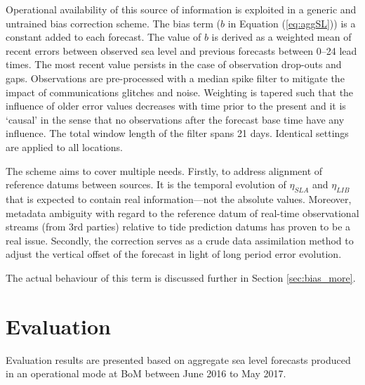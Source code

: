 Operational availability of this source of information is exploited in a generic and untrained bias correction scheme. 
The bias term ($b$ in Equation (\ref{eq:aggSL})) is a constant added to each forecast.
The value of $b$ is derived as a weighted mean of recent errors between observed sea level and previous forecasts between 0--24 lead times.
The most recent value persists in the case of observation drop-outs and gaps.
Observations are pre-processed with a median spike filter to mitigate the impact of communications glitches and noise.
Weighting is tapered such that the influence of older error values decreases with time prior to the present and it is `causal' in the sense that no observations after the forecast base time have any influence.
The total window length of the filter spans 21 days.
Identical settings are applied to all locations.


The scheme aims to cover multiple needs.
Firstly, to address alignment of reference datums between sources. 
It is the temporal evolution of $\eta_{SLA}$ and $\eta_{LIB}$ that is expected to contain real information---not the absolute values.
Moreover, metadata ambiguity with regard to the reference datum of real-time observational streams (from 3rd parties) relative to tide prediction datums has proven to be a real issue.
Secondly, the correction serves as a crude data assimilation method to adjust the vertical offset of the forecast in light of long period error evolution. 

The actual behaviour of this term is discussed further in Section \ref{sec:bias_more}.

\section{Evaluation}

Evaluation results are presented based on aggregate sea level forecasts produced in an operational mode at BoM between June 2016 to May 2017.

